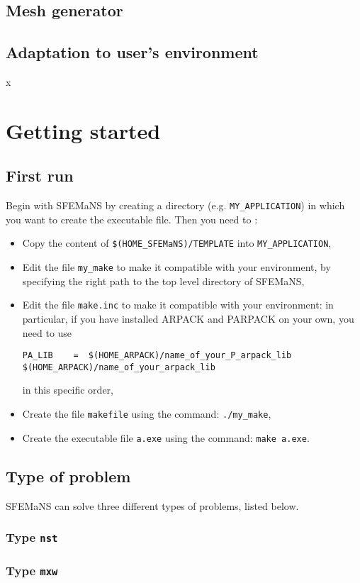 \documentclass[a4paper]{book}
\begin{document}
\section{Mesh generator}
\section{Adaptation to user's environment}

x\chapter{Getting started}
\section{First run}
Begin with SFEMaNS by creating a directory (e.g. \verb?MY_APPLICATION?) in which you want to create the executable file. Then you need to :
\begin{itemize}
\item Copy the content of \verb?$(HOME_SFEMaNS)/TEMPLATE? into \verb?MY_APPLICATION?,
\item Edit the file \verb?my_make? to make it compatible with your environment, by specifying the right path to the top level directory of SFEMaNS,
\item Edit the file \verb?make.inc? to make it compatible with your environment: in particular, if you have installed ARPACK and PARPACK on your own, you need to use
\begin{verbatim}
PA_LIB    =  $(HOME_ARPACK)/name_of_your_P_arpack_lib $(HOME_ARPACK)/name_of_your_arpack_lib
\end{verbatim}
in this specific order,
\item Create the file \verb?makefile? using the command: \verb?./my_make?,
\item Create the executable file \verb?a.exe? using the command: \verb?make a.exe?.
\end{itemize}
\section{Type of problem}
SFEMaNS can solve three different types of problems, listed below.
\subsection{Type \texttt{nst}}
\subsection{Type \texttt{mxw}}
\end{document}
